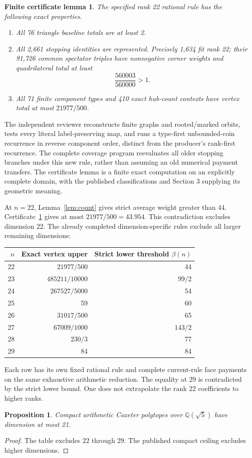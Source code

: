 \documentclass[11pt]{article}
\newtheorem{proposition}[theorem]{Proposition}
\newtheorem{certificate}[theorem]{Finite certificate lemma}
\newcommand{\Q}{\mathbb Q}
\begin{document}
\begin{certificate}\label{cert:golden}
The specified rank 22 rational rule has the following exact properties.
\begin{enumerate}
\item All 76 triangle baseline totals are at least 2.
\item All 2,661 stopping identities are represented. Precisely 1,634 fit
rank 22; their 91,726 common spectator triples have nonnegative corner
weights and quadrilateral total at least
\[
\frac{560003}{560000}>1.
\]
\item All 71 finite component types and 410 exact hub-count contexts have
vertex total at most $21977/500$.
\end{enumerate}
\end{certificate}
The independent reviewer reconstructs finite graphs and rooted/marked
orbits, tests every literal label-preserving map, and runs a type-first
unbounded-coin recurrence in reverse component order, distinct from the
producer's rank-first recurrence. The complete coverage program
reevaluates all older stopping branches under this new rule, rather than
assuming an old numerical payment transfers. The certificate lemma is a
finite exact computation on an explicitly complete domain, with the
published classifications and Section 3 supplying its geometric meaning.

At $n=22$, Lemma~\ref{lem:count} gives strict average weight greater
than 44. Certificate~\ref{cert:golden} gives at most
$21977/500=43.954$. This contradiction excludes dimension 22.
The already completed dimension-specific rules exclude all larger
remaining dimensions:
\begin{center}
\begin{tabular}{rrr}\toprule
$n$&Exact vertex upper&Strict lower threshold $\beta(n)$\\\midrule
22&$21977/500$&44\\
23&$485211/10000$&$99/2$\\
24&$267527/5000$&54\\
25&59&60\\
26&$31017/500$&65\\
27&$67009/1000$&$143/2$\\
28&$230/3$&77\\
29&84&84\\\bottomrule
\end{tabular}
\end{center}
Each row has its own fixed rational rule and complete current-rule face
payments on the same exhaustive arithmetic reduction. The equality at 29
is contradicted by the strict lower bound. One does not extrapolate the
rank 22 coefficients to higher ranks.
\begin{proposition}\label{prop:golden}
Compact arithmetic Coxeter polytopes over $\Q(\sqrt 5)$ have dimension
at most 21.
\end{proposition}
\begin{proof}
The table excludes 22 through 29. The published compact ceiling excludes
higher dimensions.
\end{proof}
\end{document}
